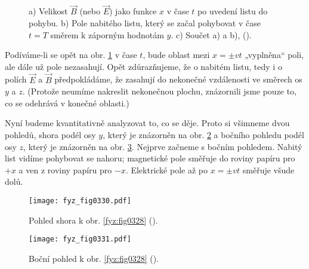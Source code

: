   \begin{figure}[hb!] %
    \centering
                  \\
                  \\
    \caption{a) Velikost \(\vec{B}\) (nebo \(\vec{E}\)) jako funkce \(x\) v čase \(t\) po uvedení 
             listu do pohybu. b) Pole nabitého listu, který se začal pohybovat v čase \(t = T\) 
             směrem k záporným hodnotám \(y\). c) Součet a) a b),
             (\cite[s.~324]{Feynman02}).}
    \label{fyz:fig0329}
  \end{figure}
  
  Podíváme-li se opět na obr. \ref{fyz:fig0329} v čase \(t\), bude oblast mezi \(x = \pm vt\) 
  „vyplněna“ poli, ale dále už pole nezasahují. Opět zdůrazňujeme, že o nabitém listu, tedy i o 
  polích \(\vec{E}\) a \(\vec{B}\) předpokládáme, že zasahují do nekonečné vzdálenosti ve směrech 
  os \(y\) a \(z\). (Protože neumíme nakreslit nekonečnou plochu, znázornili jsme pouze to, co se 
  odehrává v konečné oblasti.)
  
  Nyní budeme kvantitativně analyzovat to, co se děje. Proto si všimneme dvou pohledů, shora podél 
  osy \(y\), který je znázorněn na obr. \ref{fyz:fig0330} a bočního pohledu podél osy \(z\), který 
  je znázorněn na obr. \ref{fyz:fig0331}. Nejprve začneme s bočním pohledem. Nabitý list vidíme 
  pohybovat se nahoru; magnetické pole směřuje do roviny papíru pro \(+x\) a ven z roviny papíru 
  pro \(-x\). Elektrické pole až po \(x=\pm vt\) směřuje všude dolů.

  \begin{figure}[ht!]  %
    \centering
    \texttt{[image: fyz\_fig0330.pdf]}
    \caption{Pohled shora k obr. \ref{fyz:fig0328}
             (\cite[s.~320]{Feynman02}).}
    \label{fyz:fig0330}
  \end{figure}
  
  \begin{figure}[ht!]  %
    \centering
    \texttt{[image: fyz\_fig0331.pdf]}
    \caption{Boční pohled k obr. \ref{fyz:fig0328}
             (\cite[s.~331]{Feynman02}).}
    \label{fyz:fig0331}
  \end{figure}

